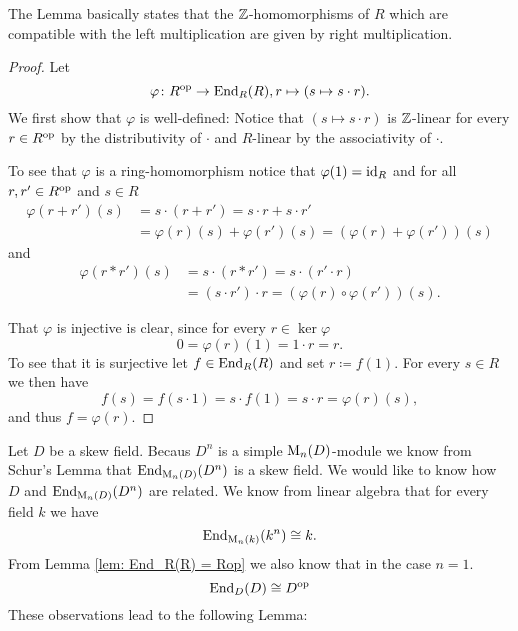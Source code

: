 The Lemma basically states that the $\mathbb{Z}$-homomorphisms of $R$ which are compatible with the left multiplication are given by right multiplication.


\begin{proof}
  Let
  \[
    \varphi \colon R^{\mathrm{op}} \to \operatorname{End}_R(R), r \mapsto (s \mapsto s \cdot r).
  \]
  We first show that $\varphi$ is well-defined: Notice that $(s \mapsto s \cdot r)$ is $\mathbb{Z}$-linear for every $r \in R^{\mathrm{op}}$ by the distributivity of $\cdot$ and $R$-linear by the associativity of $\cdot$.
  
  To see that $\varphi$ is a ring-homomorphism notice that $\varphi(1) = \operatorname{id}_R$ and for all $r,r' \in R^{\mathrm{op}}$ and $s \in R$
  \begin{align*}
    \varphi(r+r')(s)
    &= s \cdot (r + r')
    = s \cdot r + s \cdot r' \\
    &= \varphi(r)(s) + \varphi(r')(s)
    = (\varphi(r)+\varphi(r'))(s)
  \end{align*}
  and
  \begin{align*}
    \varphi(r * r')(s)
    &= s \cdot (r * r')
    = s \cdot (r' \cdot r) \\
    &= (s \cdot r') \cdot r
    = \left(\varphi(r) \circ \varphi(r')\right)(s).
  \end{align*}
  
  That $\varphi$ is injective is clear, since for every $r \in \ker \varphi$
  \[
    0 = \varphi(r)(1) = 1 \cdot r = r.
  \]
  To see that it is surjective let $f \in \operatorname{End}_R(R)$ and set $r \coloneqq f(1)$. For every $s \in R$ we then have
  \[
    f(s) = f(s \cdot 1) = s \cdot f(1) = s \cdot r = \varphi(r)(s),
  \]
  and thus $f = \varphi(r)$.
\end{proof}


Let $D$ be a skew field. Becaus $D^n$ is a simple $\operatorname{M}_n(D)$-module we know from Schur’s Lemma that $\operatorname{End}_{\operatorname{M}_n(D)}(D^n)$ is a skew field. We would like to know how $D$ and $\operatorname{End}_{\operatorname{M}_n(D)}(D^n)$ are related. We know from linear algebra that for every field $k$ we have
\[
  \operatorname{End}_{\operatorname{M}_n(k)}(k^n) \cong k.
\]
From Lemma \ref{lem: End_R(R) = Rop} we also know that in the case $n = 1$. 
\[
  \operatorname{End}_D(D) \cong D^{\mathrm{op}}
\]
These observations lead to the following Lemma:


